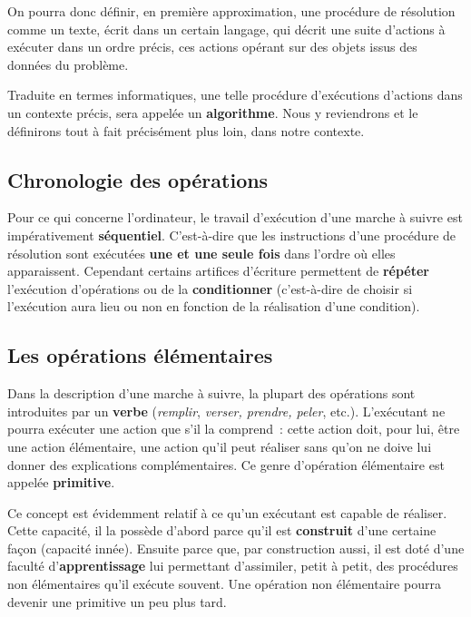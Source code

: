 		On pourra donc définir, en première approximation, 
		une procédure de résolution comme un texte, 
		écrit dans un certain langage, 
		qui décrit une suite d’actions à exécuter dans un ordre précis, 
		ces actions opérant sur des objets issus des données du problème.
		
		Traduite en termes informatiques, une telle procédure d'exécutions d'actions
		dans un contexte précis, sera appelée un \textbf{algorithme}. Nous y reviendrons
		et le définirons tout à fait précisément plus loin, dans notre contexte.
	
		\subsection{Chronologie des opérations}
		
			Pour ce qui concerne l’ordinateur, 
			le travail d’exécution d’une marche à suivre 
			est impérativement \textbf{séquentiel}. 
			C’est-à-dire que les instructions d’une procédure de résolution 
			sont exécutées \textbf{une et une seule fois} 
			dans l’ordre où elles apparaissent.
			Cependant certains artifices d’écriture 
			permettent de \textbf{répéter} l’exécution d’opérations 
			ou de la \textbf{conditionner}
			(c’est-à-dire de choisir si l’exécution aura lieu ou non 
			en fonction de la réalisation d’une condition).
	
		\subsection{Les opérations élémentaires}
		
			Dans la description d’une marche à suivre, 
			la plupart des opérations sont introduites par un \textbf{verbe}
			(\textit{remplir}, \textit{verser, prendre, peler}, etc.). 
			L’exécutant ne pourra exécuter une action que s’il la comprend~:
			cette action doit, pour lui, être une action élémentaire, 
			une action qu’il peut réaliser 
			sans qu’on ne doive lui donner des explications complémentaires. 
			Ce genre d’opération élémentaire est appelée \textbf{primitive}.
			
			Ce concept est évidemment relatif 
			à ce qu’un exécutant est capable de réaliser. 
			Cette capacité, il la possède d’abord 
			parce qu’il est \textbf{construit} d’une certaine façon 
			(capacité innée). 
			Ensuite parce que, par construction aussi, 
			il est doté d’une faculté d’\textbf{apprentissage} 
			lui permettant d’assimiler, petit à petit, 
			des procédures non élémentaires qu’il exécute souvent. 
			Une opération non élémentaire 
			pourra devenir une primitive un peu plus tard.
			
